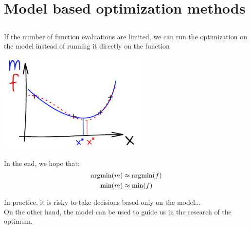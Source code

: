\documentclass{beamer}
\newcommand{\argmin}{\operatornamewithlimits{argmin}}
\begin{document}
\section[Model based optim.]{Model based optimization methods}
\subsection{}

\begin{frame}{}
If the number of function evaluations are limited, we can run the optimization on the model instead of running it directly on the function
\begin{center}
\includegraphics[height=5cm]{figures/ink_mf}
\end{center}
In the end, we hope that:
\begin{equation}
	\begin{split}
		\argmin(m) & \approx \argmin(f)\\
		\min(m) & \approx \min(f)\\
	\end{split}
\end{equation}
\end{frame}

\begin{frame}{}
In practice, it is risky to take decisions based only on the model...\\
\vspace{3mm} 
On the other hand, the model can be used to guide us in the research of the optimum. 

\end{frame}
\end{document}
